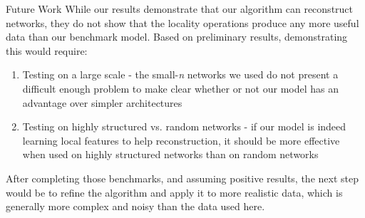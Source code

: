 \documentclass[12pt]{article}
\begin{document}
\begin{posterbard}
	{
	\begin{posterboxtitle}{Future Work}
		\noindent While our results demonstrate that our algorithm can 
		reconstruct networks, they do not show that the locality operations 
		produce any more useful data than our benchmark model. Based on 
		preliminary results, demonstrating this would require:
		\begin{enumerate}
			\item Testing on a large scale - the small-\textit{n} networks we 
				used do not present a difficult enough problem to make clear 
				whether or not our model has an advantage over simpler 
				architectures
			\item Testing on highly structured vs. random networks - if our 
				model is indeed learning local features to help reconstruction, 
				it should be more effective when used on highly structured 
				networks than on random networks
		\end{enumerate}
		After completing those benchmarks, and assuming positive results, the 
		next step would be to refine the algorithm and apply it to more 
		realistic data, which is generally more complex and noisy than the data 
		used here.\\
	\end{posterboxtitle}
}


\end{posterbard}
\end{document}

